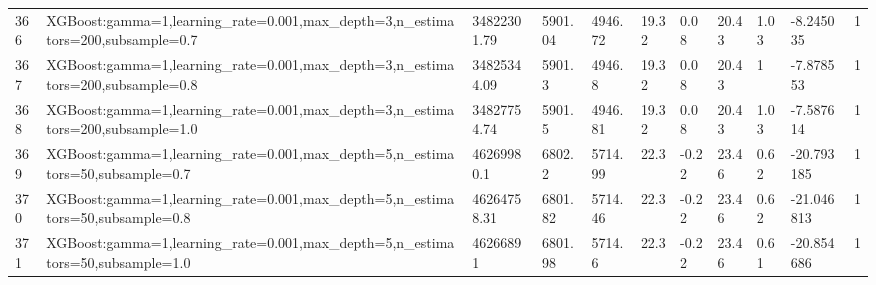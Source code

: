 \begin{longtable}{C{0.8cm} L{2cm} C{1.15cm} C{1.15cm} C{1.15cm} C{1.15cm} C{0.85cm} C{1.25cm} C{1.2cm} C{1.5cm} C{1.0cm}}
366 & XGBoost:\newline gamma=1,\newline learning\_rate=0.001,\newline max\_depth=3,\newline n\_estimators=200,\newline subsample=0.7 & 34822301.79 & 5901.04 & 4946.72 & 19.32 & 0.08 & 20.43 & 1.03 & -8.245035 & 1 \\
367 & XGBoost:\newline gamma=1,\newline learning\_rate=0.001,\newline max\_depth=3,\newline n\_estimators=200,\newline subsample=0.8 & 34825344.09 & 5901.3 & 4946.8 & 19.32 & 0.08 & 20.43 & 1 & -7.878553 & 1 \\
368 & XGBoost:\newline gamma=1,\newline learning\_rate=0.001,\newline max\_depth=3,\newline n\_estimators=200,\newline subsample=1.0 & 34827754.74 & 5901.5 & 4946.81 & 19.32 & 0.08 & 20.43 & 1.03 & -7.587614 & 1 \\
369 & XGBoost:\newline gamma=1,\newline learning\_rate=0.001,\newline max\_depth=5,\newline n\_estimators=50,\newline subsample=0.7 & 46269980.1 & 6802.2 & 5714.99 & 22.3 & -0.22 & 23.46 & 0.62 & -20.793185 & 1 \\
370 & XGBoost:\newline gamma=1,\newline learning\_rate=0.001,\newline max\_depth=5,\newline n\_estimators=50,\newline subsample=0.8 & 46264758.31 & 6801.82 & 5714.46 & 22.3 & -0.22 & 23.46 & 0.62 & -21.046813 & 1 \\
371 & XGBoost:\newline gamma=1,\newline learning\_rate=0.001,\newline max\_depth=5,\newline n\_estimators=50,\newline subsample=1.0 & 46266891 & 6801.98 & 5714.6 & 22.3 & -0.22 & 23.46 & 0.61 & -20.854686 & 1 \\

\end{longtable}
